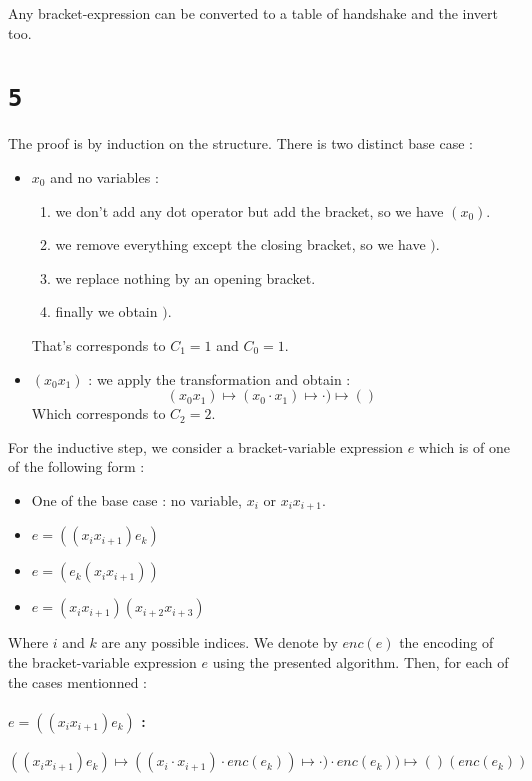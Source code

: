 \documentclass[a4paper,11pt]{report}
\begin{document}
Any bracket-expression can be converted to a table of handshake and the invert
too.

\section*{\texttt{5}}

The proof is by induction on the structure. There is two distinct base case :
\begin{itemize}
\item $x_0$ and  no variables :
  \begin{enumerate}
  \item we don't add any dot operator but add the bracket, so we have $(x_0)$.
  \item we remove everything except the closing bracket, so we have $)$.
  \item we replace nothing by an opening bracket.
  \item finally we obtain $)$.
  \end{enumerate}
  That's corresponds to $C_1 = 1$ and $C_0 = 1$.
\item $(x_0x_1)$ : we apply the transformation and obtain :
  \[
    (x_0x_1) \mapsto (x_0 \cdot x_1) \mapsto \cdot ) \mapsto ()
  \]
  Which corresponds to $C_2 = 2$.
\end{itemize}

For the inductive step, we consider a bracket-variable expression $e$ which is
of one of the following form :
\begin{itemize}
\item One of the base case : no variable, $x_i$ or $x_ix_{i+1}$.
\item $e = ((x_ix_{i+1})e_k)$
\item $e = (e_k(x_ix_{i+1}))$
\item $e = (x_ix_{i+1})(x_{i+2}x_{i+3})$
\end{itemize}

Where $i$ and $k$ are any possible indices. We denote by $enc(e)$ the encoding
of the bracket-variable expression $e$ using the presented algorithm. Then, for
each of the cases mentionned :

\paragraph{$e = ((x_ix_{i+1})e_k)$ :}
\[
  ((x_ix_{i+1})e_k) \mapsto ((x_i \cdot x_{i+1}) \cdot enc(e_k)) \mapsto \cdot )
  \cdot enc(e_k) ) \mapsto ()(enc(e_k))
\]
\end{document}
